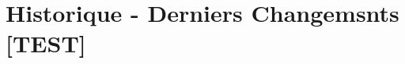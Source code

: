 \documentclass[12pt,a4paper]{article}
\newcommand\inputlast{
	
}
\begin{document}
\newpage

\section{Historique - Derniers Changemsnts [TEST]}

\inputlast{}
\end{document}
